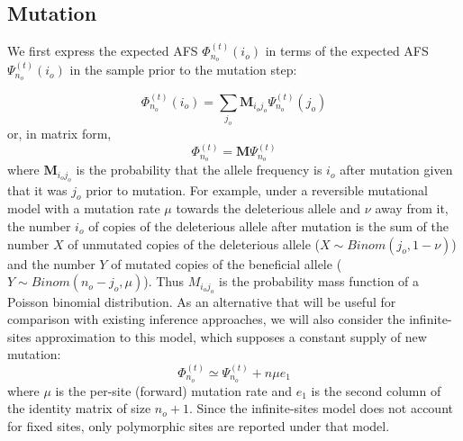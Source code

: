 \documentclass[9pt,twocolumn,twoside,lineno]{gsajnl}
\newcommand{\afs}[2]{\Phi_{#1}^{(#2)}}
\newcommand{\afsPsi}[2]{\Psi_{#1}^{(#2)}}
\begin{document}
\subsection{Mutation}
We first express the expected AFS $\afs{n_o}{t}(i_o)$ in terms of the expected AFS $\afsPsi{n_o}{t}(i_o)$ in the sample prior to the mutation step:   

\begin{equation}
  \afs{n_o}{t}(i_o)=  \sum_{j_o} \mathbf{M}_{i_oj_o} \afsPsi{n_o}{t}(j_o) 
  \label{mut}
\end{equation}
or, in matrix form, 
\begin{equation}
  \afs{n_o}{t}= \mathbf{M} \afsPsi{n_o}{t}
  \label{mut}
\end{equation}
where $\mathbf{M}_{i_oj_o}$ is the probability that the allele frequency is $i_o$ after mutation given that it was $j_o$ prior to mutation. For example, under a reversible mutational model with a mutation rate $\mu$ towards the deleterious allele and $\nu$ away from it, the number $i_o$ of copies of the deleterious allele after mutation is the sum of the number $X$ of unmutated copies of the deleterious allele ($X \sim \mathit{Binom}(j_o, 1-\nu)$)  and the number $Y$ of mutated copies of the beneficial allele  ($Y \sim \mathit{Binom}(n_o-j_o, \mu)$). Thus $M_{i_oj_o}$ is the probability mass function of a Poisson binomial distribution. As an alternative that will be useful for comparison with existing inference approaches, we will also consider the infinite-sites approximation to this model, which supposes a constant supply of new mutation:  
\begin{equation}
  \afs{n_o}{t} \simeq  \afsPsi{n_o}{t} + n \mu e_1
\end{equation}
where $\mu$ is the per-site (forward) mutation rate and $e_1$ is the second column of the identity
matrix of size $n_o+1.$ Since the infinite-sites model does not account for fixed sites,
only polymorphic sites are reported under that model. 


%
%
\end{document}
